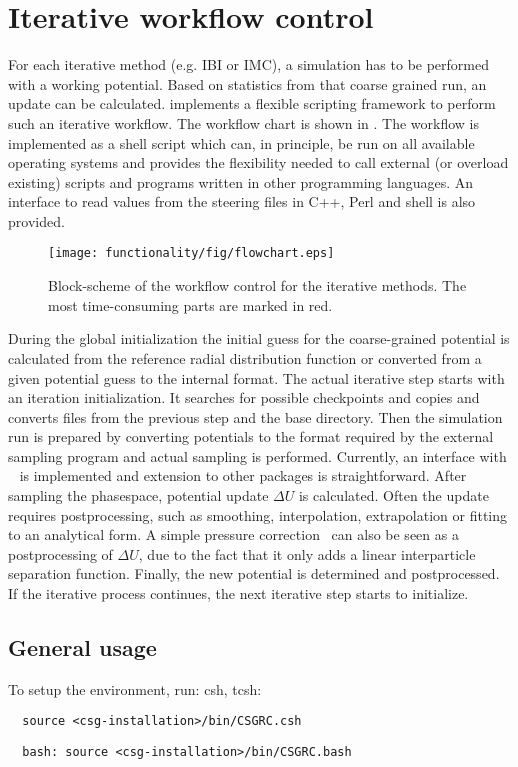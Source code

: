 \section{Iterative workflow control}
\label{sec:impl:scripting}
For each iterative method (e.g. IBI or IMC), a simulation has to be performed with a working potential. Based on statistics from that coarse grained run, an update can be calculated. \votca implements a flexible scripting framework to perform such an iterative workflow. The workflow chart is shown in . The workflow is implemented as a shell script which can, in principle, be run on all available operating systems and provides the flexibility needed to call external (or overload existing) scripts and programs written in other programming languages. An interface to read values from the steering \xml files in C++, Perl and shell is also provided.

\begin{figure}
  \texttt{[image: functionality/fig/flowchart.eps]}
  \caption{
    \label{fig:flowchart}
    Block-scheme of the workflow control for the iterative methods. The most time-consuming parts are marked in red.
  }
\end{figure}

During the global initialization the initial guess for the coarse-grained potential is calculated from the reference radial distribution function or converted from a given potential guess to the internal format. The actual iterative step starts with an iteration initialization. It searches for possible checkpoints and copies and converts files from the previous step and the base directory. Then the simulation run is prepared by converting potentials to the format required by the external sampling program and actual sampling is performed. Currently, an interface with \gromacs~\cite{gromacs4} is implemented and extension to other packages is straightforward. After sampling the phasespace, potential update $\Delta U$ is calculated. Often the update requires postprocessing, such as smoothing, interpolation, extrapolation or fitting to an analytical form. A simple pressure correction~\cite{Reith:2003} can also be seen as a postprocessing of $\Delta U$, due to the fact that it only adds a linear interparticle separation function.
%
Finally, the new potential is determined and postprocessed. If the iterative process continues, the next iterative step starts to initialize.

\subsection{General usage}
To setup the environment, run:
csh, tcsh:
\begin{verbatim}
  source <csg-installation>/bin/CSGRC.csh
\end{verbatim}
\begin{verbatim}
  bash: source <csg-installation>/bin/CSGRC.bash
\end{verbatim}


